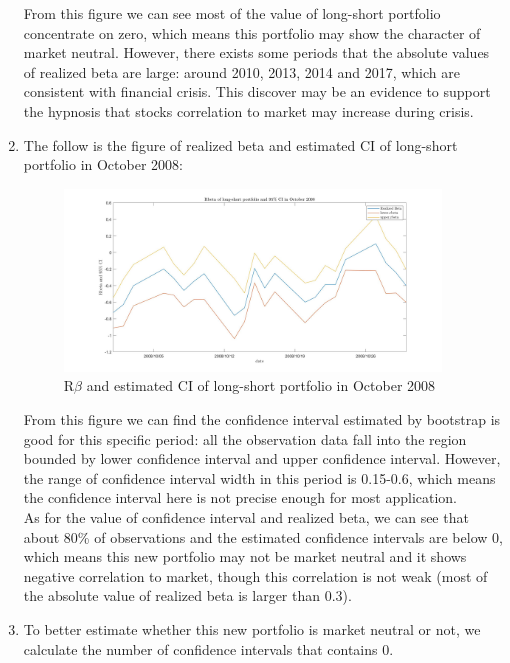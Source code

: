 \documentclass[12pt,letterpaper]{article}
\begin{document}
\begin{enumerate}[label=\textbf{(\Alph*)}]
From this figure we can see most of the value of long-short portfolio concentrate on zero, which means this portfolio may show the character of market neutral. However, there exists some periods that the absolute values of realized beta are large: around 2010, 2013, 2014 and 2017, which are consistent with financial crisis. This discover may be an evidence to support the hypnosis that stocks correlation to market may increase during crisis. \\


  
\item 
The follow is the figure of realized beta and estimated CI of long-short portfolio in October 2008: 
\begin{figure}[H]
           \centering
            \includegraphics[width=10cm]{figures/q2_d.jpg}
            \centering
            \caption{R$\beta$ and estimated CI of long-short portfolio in October 2008}
\end{figure}
From this figure we can find the confidence interval estimated by bootstrap is good for this specific period: all the observation data fall  into the region bounded by lower confidence interval and upper confidence interval. However, the range of confidence interval width in this period is 0.15-0.6, which means the confidence interval here is not precise enough for most application. \\

As for the value of confidence interval and realized beta, we can see that about 80\% of observations and the estimated confidence intervals are below 0, which means this new portfolio may not be market neutral and it shows negative correlation to market, though this correlation is not weak (most of the absolute value of realized beta is larger than 0.3).\\

\item
To better estimate whether this new portfolio is market neutral or not, we calculate the number of confidence intervals that contains 0.


\end{enumerate}
\end{document}
